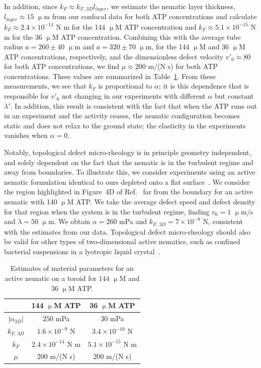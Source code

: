 In addition, since $k_F \approx k_{F,\,3D}l_{layer}$, we estimate the nematic layer thickness, $l_{layer} \approx 15$ $\upmu$m from our confocal data for both ATP concentrations and calculate $k_F \approx 2.4 \times 10^{-14}$ N m for the 144 $\upmu$M ATP concentration and $k_F \approx 5.1 \times 10^{-15}$ N m for the 36 $\upmu$M ATP concentration.
Combining this with the average tube radius $a = 260 \pm 40$ $\upmu$m and $a = 320 \pm 70$ $\upmu$m, for the 144 $\upmu$M and 36 $\upmu$M ATP concentrations, respectively, and the dimensionless defect velocity $v'_0 \approx 80$ for both ATP concentrations, we find $\mu \approx 200$ m/(N s) for both ATP concentrations.
These values are summarized in Table~\ref{t:3-MaterialParams}.
From these measurements, we see that $k_F$ is proportional to $\alpha$; it is this dependence that is responsible for $v'_0$ not changing in our experiments with different $\alpha$ but constant $\lambda'$.
In addition, this result is consistent with the fact that when the ATP runs out in an experiment and the activity ceases, the nematic configuration becomes static and does not relax to the ground state; the elasticity in the experiments vanishes when $\alpha = 0$.

Notably, topological defect micro-rheology is in principle geometry independent, and solely dependent on the fact that the nematic is in the turbulent regime and away from boundaries.
To illustrate this, we consider experiments using an active nematic formulation identical to ours depleted onto a flat surface~\cite{RN134}. We consider the region highlighted in Figure~4D of Ref.~\cite{RN134} far from the boundary for an active nematic with 140 $\upmu$M ATP.
We take the average defect speed and defect density for that region when the system is in the turbulent regime, finding $v_0 = 1$ $\upmu$m/s and $\lambda = 50$ $\upmu$m.
We obtain $\alpha = 260$ mPa and $k_{F,\, 3D} = 7 \times 10^{-9}$ N, consistent with the estimates from our data.
Topological defect micro-rheology should also be valid for other types of two-dimensional active nematics, such as confined bacterial suspensions in a lyotropic liquid crystal~\cite{RN86}.
\begin{table}
  \centering
  \caption{Estimates of material parameters for an active nematic on a toroid for $144$ $\upmu$M and 36 $\upmu$M ATP.}
  \begin{tabular}{|c|c c|}
    \hline
     & 144 $\upmu$M ATP & 36 $\upmu$M ATP \\
     \hline
     $|\alpha_{3D}|$ &  $250$ mPa & $30$ mPa \\
     $k_{F,\, 3D}$ & $1.6 \times 10^{-9}$ N & $3.4 \times 10^{-10}$ N \\
     $k_F$ & $2.4 \times 10^{-14}$ N m & $5.1 \times 10^{-15}$ N m \\
     $\mu$ & 200 m/(N s) & 200 m/(N s) \\
     \hline
  \end{tabular}\label{t:3-MaterialParams}
\end{table}



